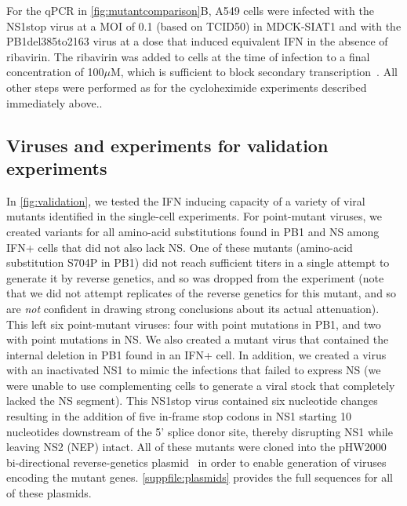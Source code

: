 \documentclass[10pt,letterpaper]{article}
\newcommand{\FIG}[1]{\autoref{fig:#1}}
\newcommand{\SUPPFILE}[1]{\autoref{suppfile:#1}}
\begin{document}
For the qPCR in \FIG{mutantcomparison}B, A549 cells were infected with the NS1stop virus at a MOI of 0.1 (based on TCID50) in MDCK-SIAT1 and with the PB1del385to2163 virus at a dose that induced equivalent IFN in the absence of ribavirin.
The ribavirin was added to cells at the time of infection to a final concentration of 100$\mu$M, which is sufficient to block secondary transcription~\citep{Vanderlinden:2016ec,reuther2015generation,Scholtissek:1976wg}.
All other steps were performed as for the cycloheximide experiments described immediately above..

\subsection*{Viruses and experiments for validation experiments}
In \FIG{validation}, we tested the IFN inducing capacity of a variety of viral mutants identified in the single-cell experiments.
For point-mutant viruses, we created variants for all amino-acid substitutions found in PB1 and NS among IFN+ cells that did not also lack NS.
One of these mutants (amino-acid substitution S704P in PB1) did not reach sufficient titers in a single attempt to generate it by reverse genetics, and so was dropped from the experiment (note that we did not attempt replicates of the reverse genetics for this mutant, and so are \emph{not} confident in drawing strong conclusions about its actual attenuation).
This left six point-mutant viruses: four with point mutations in PB1, and two with point mutations in NS.
We also created a mutant virus that contained the internal deletion in PB1 found in an IFN+ cell.
In addition, we created a virus with an inactivated NS1 to mimic the infections that failed to express NS (we were unable to use complementing cells to generate a viral stock that completely lacked the NS segment).
This NS1stop virus contained six nucleotide changes resulting in the addition of five in-frame stop codons in NS1 starting 10 nucleotides downstream of the 5' splice donor site, thereby disrupting NS1 while leaving NS2 (NEP) intact.
All of these mutants were cloned into the pHW2000 bi-directional reverse-genetics plasmid~\citep{hoffmann2000dna} in order to enable generation of viruses encoding the mutant genes.
 \SUPPFILE{plasmids} provides the full sequences for all of these plasmids.
\end{document}
